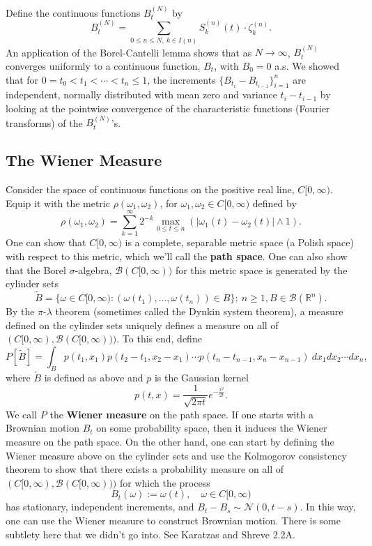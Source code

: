 \documentclass[11pt,letterpaper]{article}
\newcommand{\reals}{\mathbb{R}}
\newcommand{\mcal}[1]{\mathcal{#1}}
\theoremstyle{plain}
\theoremstyle{definition}
\begin{document}
\noindent Define the continuous functions $B^{(N)}_t$ by
\[
B^{(N)}_t = \sum_{0\leq n\leq N,\ k\in I(n)}S_k^{(n)}(t)\cdot \zeta_k^{(n)}.
\]
An application of the Borel-Cantelli lemma shows that as $N\to \infty$, $B^{(N)}_t$ converges uniformly to a continuous function, $B_t$, with $B_0 = 0$ a.s. We showed that for $0 = t_0 < t_1 <\cdots < t_n\leq 1$, the increments $\{B_{t_i}-B_{t_{i-1}}\}_{i=1}^n$ are independent, normally distributed with mean zero and variance $t_i - t_{i-1}$ by looking at the pointwise convergence of the characteristic functions (Fourier transforms) of the $B^{(N)}_t$'s.

\subsection{The Wiener Measure}
Consider the space of continuous functions on the positive real line, $C[0, \infty)$. Equip it with the metric $\rho(\omega_1, \omega_2)$, for $\omega_1, \omega_2\in C[0, \infty)$ defined by
\[
\rho(\omega_1, \omega_2) = \sum_{k=1}^\infty 2^{-k}\max_{0\leq t\leq n}(|\omega_1(t) - \omega_2(t)| \land 1).
\]
One can show that $C[0,\infty)$ is a complete, separable metric space (a Polish space) with respect to this metric, which we'll call the \textbf{path space}. One can also show that the Borel $\sigma$-algebra, $\mcal{B}(C[0,\infty))$ for this metric space is generated by the cylinder sets
\[
\tilde{B} = \{\omega \in C[0, \infty): (\omega(t_1), \ldots, \omega(t_n))\in B\};\ n\geq 1, B\in \mcal{B}(\reals^n).
\]
By the $\pi$-$\lambda$ theorem (sometimes called the Dynkin system theorem), a measure defined on the cylinder sets uniquely defines a measure on all of $(C[0, \infty), \mcal{B}(C[0, \infty)))$. To this end, define
\[
P[\tilde{B}] = \int_Bp(t_1, x_1)p(t_2-t_1, x_2-x_1)\cdots p(t_n-t_{n-1}, x_n-x_{n-1})\ dx_1dx_2\cdots dx_n,
\]
where $\tilde{B}$ is defined as above and $p$ is the Gaussian kernel
\[
p(t, x) = \frac{1}{\sqrt{2\pi t}}e^{-\frac{x^2}{2t}}.
\]
We call $P$ the \textbf{Wiener measure} on the path space. If one starts with a Brownian motion $B_t$ on some probability space, then it induces the Wiener measure on the path space. On the other hand, one can start by defining the Wiener measure above on the cylinder sets and use the Kolmogorov consistency theorem to show that there exists a probability measure on all of $(C[0, \infty), \mcal{B}(C[0, \infty)))$ for which the process
\[
B_t(\omega):= \omega(t),\quad \omega\in C[0, \infty)
\] 
has stationary, independent increments, and $B_t - B_s \sim \mcal{N}(0, t-s)$. In this way, one can use the Wiener measure to construct Brownian motion. There is some subtlety here that we didn't go into. See Karatzas and Shreve 2.2A.
\end{document}
